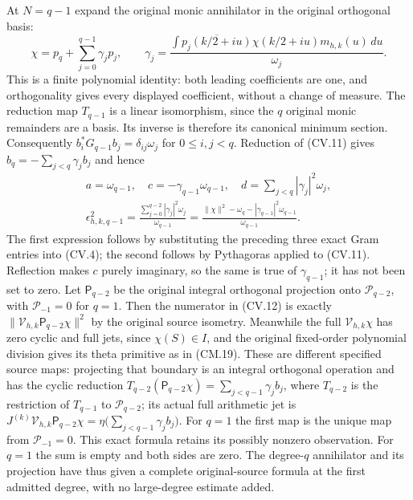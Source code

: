 At $N=q-1$ expand the original monic annihilator in the original
orthogonal basis:
\[
 \chi=p_q+\sum_{j=0}^{q-1}\gamma_jp_j,\qquad
 \gamma_j=\frac{\int\overline{p_j(k/2+iu)}\chi(k/2+iu)m_{h,k}(u)\,du}{\omega_j}.
 \tag{CV.11}
\]
This is a finite polynomial identity: both leading coefficients are one,
and orthogonality gives every displayed coefficient, without a change of
measure. The reduction map $T_{q-1}$ is a linear isomorphism, since the
$q$ original monic remainders are a basis. Its inverse is therefore its
canonical minimum section. Consequently
$b_i^*G_{q-1}b_j=\delta_{ij}\omega_j$ for $0\le i,j<q$.
Reduction of (CV.11) gives $b_q=-\sum_{j<q}\gamma_jb_j$ and hence
\[
 \begin{gathered}
 a=\omega_{q-1},\quad
 c=-\gamma_{q-1}\omega_{q-1},\quad
 d=\sum_{j<q}|\gamma_j|^2\omega_j,\\
 \boxed{\epsilon_{h,k,q-1}^2
 =\frac{\sum_{j=0}^{q-2}|\gamma_j|^2\omega_j}{\omega_{q-1}}
 =\frac{\|\chi\|^2-\omega_q-|\gamma_{q-1}|^2\omega_{q-1}}{\omega_{q-1}}.}
\end{gathered}
 \tag{CV.12}
\]
The first expression follows by substituting the preceding three exact
Gram entries into (CV.4); the second follows by Pythagoras applied to
(CV.11). Reflection makes $c$ purely imaginary, so the same is true of
$\gamma_{q-1}$; it has not been set to zero. Let $\mathsf P_{q-2}$
be the original integral orthogonal projection onto
$\mathcal P_{q-2}$, with $\mathcal P_{-1}=0$ for $q=1$.
Then the numerator in (CV.12) is exactly
$\|\mathcal V_{h,k}\mathsf P_{q-2}\chi\|^2$ by the original
source isometry. Meanwhile the full $\mathcal V_{h,k}\chi$ has
zero cyclic and full jets, since $\chi(S)\in I$, and the original
fixed-order polynomial division gives its theta primitive as in
(CM.19). These are different specified source maps: projecting that
boundary is an integral orthogonal operation and has the cyclic
reduction $T_{q-2}(\mathsf P_{q-2}\chi)=\sum_{j<q-1}\gamma_jb_j$,
where $T_{q-2}$ is the restriction of $T_{q-1}$ to $\mathcal P_{q-2}$;
its actual full arithmetic jet is
$J^{(k)}\mathcal V_{h,k}\mathsf P_{q-2}\chi
=\eta\bigl(\sum_{j<q-1}\gamma_jb_j\bigr)$.
For $q=1$ the first map is the unique map from $\mathcal P_{-1}=0$.
This exact formula retains its
possibly nonzero observation. For $q=1$ the sum is empty and both
sides are zero. The degree-$q$ annihilator and its projection have
thus given a complete original-source formula at the first admitted
degree, with no large-degree estimate added.
